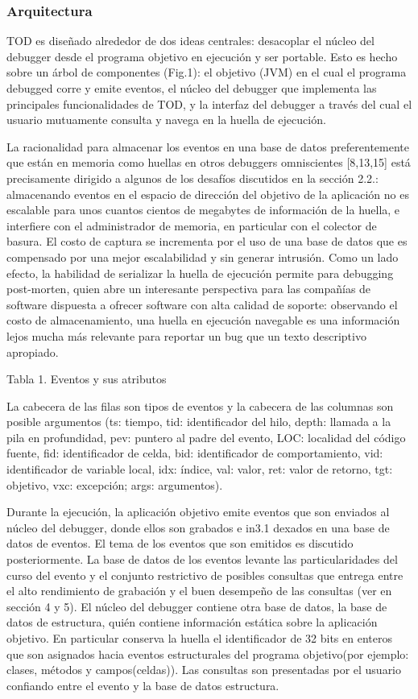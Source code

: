 \documentclass[12pt,a4paper]{report}
\begin{document}
			\subsubsection{Arquitectura}

TOD es diseñado alrededor de dos ideas centrales: desacoplar el núcleo del debugger desde el programa objetivo en ejecución y ser portable.  Esto es hecho sobre un árbol de componentes (Fig.1):  el objetivo (JVM) en el cual el programa debugged corre y emite eventos, el núcleo del debugger que implementa las principales funcionalidades de TOD, y la interfaz del debugger a través del cual el usuario mutuamente consulta y navega en la huella de ejecución.

La racionalidad para almacenar los eventos en una base de datos preferentemente que están en memoria como huellas en otros debuggers omniscientes [8,13,15] está precisamente dirigido a algunos de los desafíos discutidos en la sección 2.2.:  almacenando eventos en el espacio de dirección del  objetivo de la aplicación no es escalable para unos cuantos cientos de megabytes de información de la huella, e interfiere con el administrador de memoria, en particular con el colector de basura.  El costo de captura se incrementa por el uso de una base de datos que es compensado por una mejor escalabilidad y sin generar intrusión.  Como un lado efecto, la habilidad de serializar la huella de ejecución permite para debugging post-morten, quien abre un interesante perspectiva para las compañías de software dispuesta a ofrecer software con alta calidad de soporte:  observando el costo de almacenamiento, una huella en ejecución navegable es una información lejos mucha más relevante para reportar un bug que un texto descriptivo apropiado. 

Tabla 1.  Eventos y sus atributos

La cabecera de las filas son tipos de eventos y la cabecera de las columnas son posible argumentos (ts: tiempo, tid: identificador del hilo, depth: llamada a la pila en profundidad, pev: puntero al padre del evento, LOC: localidad del código fuente, fid: identificador de celda, bid: identificador de comportamiento, vid: identificador de variable local, idx: índice, val: valor, ret: valor de retorno, tgt: objetivo, vxc: excepción; args: argumentos).

Durante la ejecución, la aplicación objetivo emite eventos que son enviados al núcleo del debugger, donde ellos son grabados e in3.1 dexados en una base de datos de eventos.  El tema de los eventos que son emitidos es discutido posteriormente.  La base de datos de los eventos levante las particularidades del curso del evento y el conjunto restrictivo de posibles consultas que entrega entre el alto rendimiento de grabación y el buen desempeño de las consultas (ver en sección 4 y 5).  El núcleo del debugger contiene otra base de datos, la base de datos de estructura, quién contiene información estática sobre la aplicación objetivo.  En particular conserva la huella el identificador de 32 bits en enteros que son asignados hacia eventos estructurales del programa objetivo(por ejemplo: clases, métodos y campos(celdas)).  Las consultas son presentadas por el usuario confiando entre el evento y la base de datos estructura.
\end{document}
